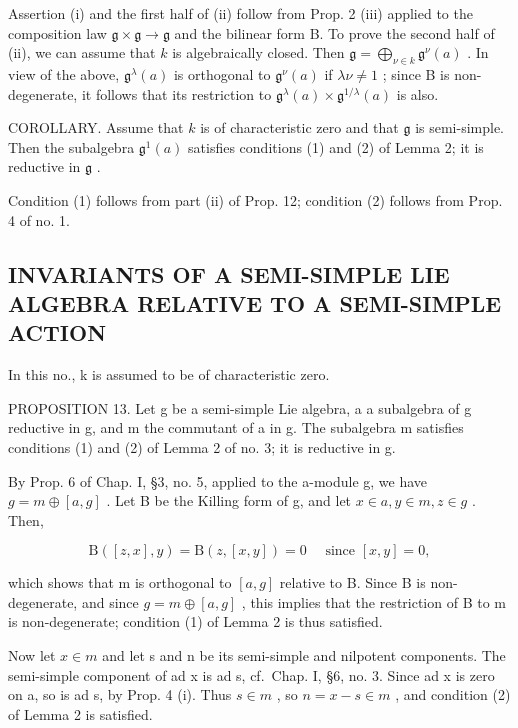 Assertion (i) and the first half of (ii) follow from Prop. 2 (iii) applied to the composition law \(\mathfrak{g} \times \mathfrak{g} \to \mathfrak{g}\) and the bilinear form B. To prove the second half of (ii), we can assume that \(k\) is algebraically closed. Then \(\mathfrak{g} = \bigoplus_{\nu \in k} \mathfrak{g}^{\nu}(a)\) . In view of the above, \(\mathfrak{g}^{\lambda}(a)\) is orthogonal to \(\mathfrak{g}^{\nu}(a)\) if \(\lambda \nu \neq 1\) ; since B is non-degenerate, it follows that its restriction to \(\mathfrak{g}^{\lambda}(a) \times \mathfrak{g}^{1/\lambda}(a)\) is also.

COROLLARY. Assume that \(k\) is of characteristic zero and that \(\mathfrak{g}\) is semi-simple. Then the subalgebra \(\mathfrak{g}^1(a)\) satisfies conditions (1) and (2) of Lemma 2; it is reductive in \(\mathfrak{g}\) .

Condition (1) follows from part (ii) of Prop. 12; condition (2) follows from Prop. 4 of no. 1.

\subsection{INVARIANTS OF A SEMI-SIMPLE LIE ALGEBRA RELATIVE TO A SEMI-SIMPLE ACTION}

In this no., k is assumed to be of characteristic zero.

PROPOSITION 13. Let g be a semi-simple Lie algebra, a a subalgebra of g reductive in g, and m the commutant of a in g. The subalgebra m satisfies conditions (1) and (2) of Lemma 2 of no. 3; it is reductive in g.

By Prop. 6 of Chap. I, §3, no. 5, applied to the a-module g, we have \(g = m \oplus [a, g]\) . Let B be the Killing form of g, and let \(x \in a, y \in m, z \in g\) . Then,

\[
\mathrm{B} ([ z, x ], y) = \mathrm{B} (z, [ x, y ]) = 0 \quad \text { since } [ x, y ] = 0,
\]

which shows that m is orthogonal to \([a,g]\) relative to B. Since B is non-degenerate, and since \(g = m \oplus [a,g]\) , this implies that the restriction of B to m is non-degenerate; condition (1) of Lemma 2 is thus satisfied.

Now let \(x \in m\) and let s and n be its semi-simple and nilpotent components. The semi-simple component of ad x is ad s, cf.~Chap. I, §6, no. 3. Since ad x is zero on a, so is ad s, by Prop. 4 (i). Thus \(s \in m\) , so \(n = x - s \in m\) , and condition (2) of Lemma 2 is satisfied.

